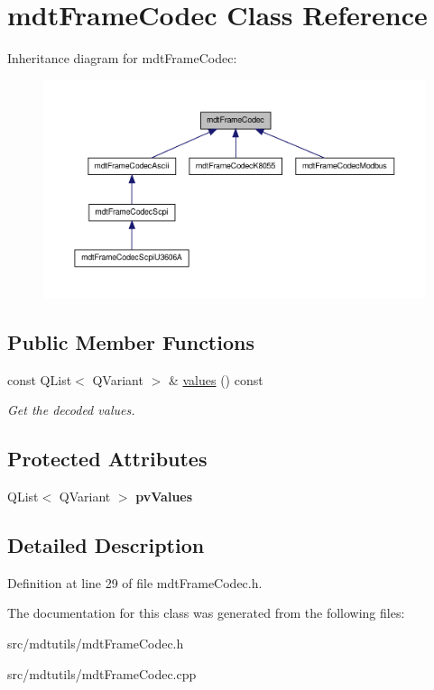 \hypertarget{classmdt_frame_codec}{
\section{mdtFrameCodec Class Reference}
\label{classmdt_frame_codec}
}


Inheritance diagram for mdtFrameCodec:\nopagebreak
\begin{figure}[H]
\begin{center}
\leavevmode
\includegraphics[width=400pt]{classmdt_frame_codec__inherit__graph}
\end{center}
\end{figure}
\subsection*{Public Member Functions}
\begin{DoxyCompactItemize}
\item 
\hypertarget{classmdt_frame_codec_af3353b74e1ab64ad7cc764dcaf22e7e8}{
const QList$<$ QVariant $>$ \& \hyperlink{classmdt_frame_codec_af3353b74e1ab64ad7cc764dcaf22e7e8}{values} () const }
\label{classmdt_frame_codec_af3353b74e1ab64ad7cc764dcaf22e7e8}

\begin{DoxyCompactList}\small\item\em Get the decoded values. \end{DoxyCompactList}\end{DoxyCompactItemize}
\subsection*{Protected Attributes}
\begin{DoxyCompactItemize}
\item 
\hypertarget{classmdt_frame_codec_a3e7dc48b11dda3688f48eea2030f0953}{
QList$<$ QVariant $>$ {\bfseries pvValues}}
\label{classmdt_frame_codec_a3e7dc48b11dda3688f48eea2030f0953}

\end{DoxyCompactItemize}


\subsection{Detailed Description}


Definition at line 29 of file mdtFrameCodec.h.



The documentation for this class was generated from the following files:\begin{DoxyCompactItemize}
\item 
src/mdtutils/mdtFrameCodec.h\item 
src/mdtutils/mdtFrameCodec.cpp\end{DoxyCompactItemize}
